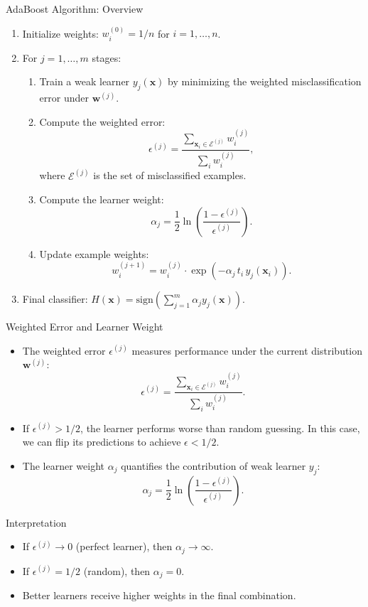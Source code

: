 \begin{frame}{AdaBoost Algorithm: Overview}
  \begin{enumerate}
    \item Initialize weights: $w_i^{(0)} = 1/n$ for $i = 1, \ldots, n$.
    \item For $j = 1, \ldots, m$ stages:
      \begin{enumerate}
        \item Train a weak learner $y_j(\mathbf{x})$ by minimizing the \alert{weighted}
              misclassification error under $\mathbf{w}^{(j)}$.
        \item Compute the weighted error:
              \[
              \epsilon^{(j)} = \frac{\sum_{\mathbf{x}_i \in \mathcal{E}^{(j)}} w_i^{(j)}}{\sum_i w_i^{(j)}},
              \]
              where $\mathcal{E}^{(j)}$ is the set of misclassified examples.
        \item Compute the learner weight:
              \[
              \alpha_j = \frac{1}{2}\ln\left(\frac{1 - \epsilon^{(j)}}{\epsilon^{(j)}}\right).
              \]
        \item Update example weights:
              \[
              w_i^{(j+1)} = w_i^{(j)} \cdot \exp\left(-\alpha_j\, t_i\, y_j(\mathbf{x}_i)\right).
              \]
      \end{enumerate}
    \item Final classifier: $H(\mathbf{x}) = \text{sign}\left(\sum_{j=1}^{m} \alpha_j y_j(\mathbf{x})\right)$.
  \end{enumerate}
\end{frame}

\begin{frame}{Weighted Error and Learner Weight}
  \begin{itemize}
    \item The \alert{weighted error} $\epsilon^{(j)}$ measures performance under the current
          distribution $\mathbf{w}^{(j)}$:
          \[
          \epsilon^{(j)} = \frac{\sum_{\mathbf{x}_i \in \mathcal{E}^{(j)}} w_i^{(j)}}{\sum_i w_i^{(j)}}.
          \]
    \item If $\epsilon^{(j)} > 1/2$, the learner performs worse than random guessing.
          In this case, we can flip its predictions to achieve $\epsilon < 1/2$.
    \item The \alert{learner weight} $\alpha_j$ quantifies the contribution of weak learner $y_j$:
          \[
          \alpha_j = \frac{1}{2}\ln\left(\frac{1 - \epsilon^{(j)}}{\epsilon^{(j)}}\right).
          \]
  \end{itemize}
  \begin{block}{Interpretation}
    \begin{itemize}
      \item If $\epsilon^{(j)} \to 0$ (perfect learner), then $\alpha_j \to \infty$.
      \item If $\epsilon^{(j)} = 1/2$ (random), then $\alpha_j = 0$.
      \item Better learners receive higher weights in the final combination.
    \end{itemize}
  \end{block}
\end{frame}


